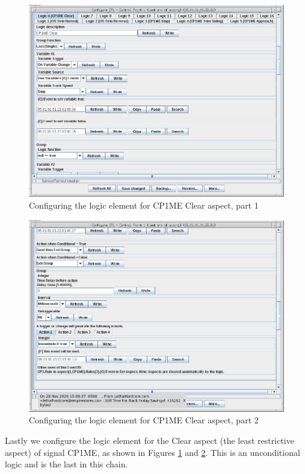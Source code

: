 \clearpage
\begin{figure}[hbpt]\begin{centering}%
\includegraphics[width=5in]{CP1ME-Clear-Logic-Config1.png}
\caption{Configuring the logic element for CP1ME Clear aspect, part 1}
\label{fig:CP1ME-Clear-Logic-Config1}
\end{centering}\end{figure}
\begin{figure}[hbpt]\begin{centering}%
\includegraphics[width=5in]{CP1ME-Clear-Logic-Config2.png}
\caption{Configuring the logic element for CP1ME Clear aspect, part 2}
\label{fig:CP1ME-Clear-Logic-Config2}
\end{centering}\end{figure}
Lastly we configure the logic element for the Clear aspect (the least 
restrictive aspect) of signal CP1ME, as shown in Figures 
\ref{fig:CP1ME-Clear-Logic-Config1} and 
\ref{fig:CP1ME-Clear-Logic-Config2}. This is an unconditional logic and is the 
last in this chain.


